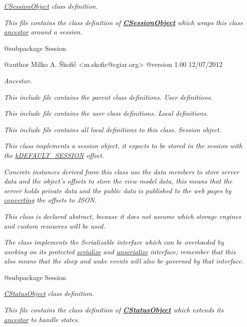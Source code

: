 {\itshape {\itshape \hyperlink{class_c_session_object}{C\-Session\-Object}} class definition.}

{\itshape This file contains the class definition of {\bfseries \hyperlink{class_c_session_object}{C\-Session\-Object}} which wraps this class \hyperlink{class_c_array_object}{ancestor} around a session.}

{\itshape \begin{DoxyVerb} @subpackage        Session

 @author            Milko A. Škofič <m.skofic@cgiar.org>
 @version   1.00 12/07/2012\end{DoxyVerb}
}

{\itshape Ancestor.}

{\itshape This include file contains the parent class definitions. User definitions.}

{\itshape This include file contains the user class definitions. Local definitions.}

{\itshape This include file contains all local definitions to this class. Session object.}

{\itshape This class implements a session object, it expects to be stored in the session with the \hyperlink{}{k\-D\-E\-F\-A\-U\-L\-T\-\_\-\-S\-E\-S\-S\-I\-O\-N} offset.}

{\itshape Concrete instances derived from this class use the data members to store server data and the object's offsets to store the view model data, this means that the server holds private data and the public data is published to the web pages by \hyperlink{}{converting} the offsets to J\-S\-O\-N.}

{\itshape This class is declared abstract, because it does not assume which storage engines and custom resources will be used.}

{\itshape The class implements the {\itshape Serializable} interface which can be overloaded by working on its protected \hyperlink{}{serialize} and \hyperlink{}{unserialize} interface; remember that this also means that the sleep and wake events will also be governed by that interface.}

{\itshape \begin{DoxyVerb} @subpackage        Session\end{DoxyVerb}
}

{\itshape {\itshape \hyperlink{class_c_status_object}{C\-Status\-Object}} class definition.}

{\itshape This file contains the class definition of {\bfseries \hyperlink{class_c_status_object}{C\-Status\-Object}} which extends its \hyperlink{class_c_array_object}{ancestor} to handle states.}

